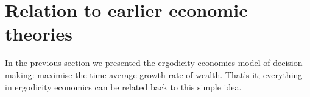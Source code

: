 %
%
%

\section{Relation to earlier economic theories}
In the previous section we presented the ergodicity economics model of decision-making: maximise the time-average growth rate of wealth.
That's it; everything in ergodicity economics can be related back to this simple idea. 

